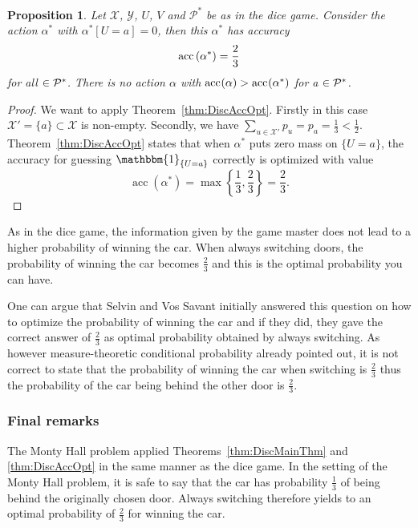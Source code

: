\documentclass[a4paper]{report}
\theoremstyle{plain}
\newtheorem{proposition}[theorem]{Proposition}
\theoremstyle{definition}
\theoremstyle{remark}
\numberwithin{equation}{chapter}
\let\P\relax
\DeclareMathOperator{\P}{\mathbb{P}}
\DeclareMathOperator{\1}{\mathbbm{1}}
\newcommand{\X}{\mathcal{X}}
\newcommand{\Y}{\mathcal{Y}}
\DeclareMathOperator{\acc}{acc}
\newcommand{\Pmod}{\mathcal{P}^*}
\newcommand{\MontyInd}{\1_{\{U=a\}}}
\begin{document}
\begin{proposition}
Let $\X$, $\Y$, $U$, $V$ and $\Pmod$ be as in the dice game. Consider the action $\alpha^*$ with $\alpha^*[U=a]=0$, then this $\alpha^*$ has accuracy
\begin{equation}
\acc^{\P}\left(\alpha^*\right)=\frac{2}{3}
\end{equation}
for all $\P\in\Pmod$. There is no action $\alpha$ with $\acc^{\P}(\alpha)>\acc^{\P}(\alpha^*)$ for a $\P\in\Pmod$.
\end{proposition}
\begin{proof}
We want to apply Theorem~\ref{thm:DiscAccOpt}. Firstly in this case $\X'=\{a\}\subset\X$ is non-empty. Secondly, we have $\sum_{u\in\X'}p_u=p_a=\frac{1}{3}<\frac{1}{2}$. Theorem~\ref{thm:DiscAccOpt} states that when $\alpha^*$ puts zero mass on $\{U=a\}$, the accuracy for guessing $\MontyInd$ correctly is optimized with value
\begin{equation}
\acc\left(\alpha^*\right)=\max\left\{\frac{1}{3},\frac{2}{3}\right\}=\frac{2}{3}.
\end{equation}
\end{proof}

As in the dice game, the information given by the game master does not lead to a higher probability of winning the car. When always switching doors, the probability of winning the car becomes $\frac{2}{3}$ and this is the optimal probability you can have.

One can argue that Selvin and Vos Savant \cite{Selvin75a,Marilyn90a} initially answered this question on how to optimize the probability of winning the car and if they did, they gave the correct answer of $\frac{2}{3}$ as optimal probability obtained by always switching. As however measure-theoretic conditional probability already pointed out, it is not correct to state that the probability of winning the car when switching is $\frac{2}{3}$ thus the probability of the car being behind the other door is $\frac{2}{3}$.

\subsubsection{Final remarks}
The Monty Hall problem applied Theorems~\ref{thm:DiscMainThm} and \ref{thm:DiscAccOpt} in the same manner as the dice game. In the setting of the Monty Hall problem, it is safe to say that the car has probability $\frac{1}{3}$ of being behind the originally chosen door. Always switching therefore yields to an optimal probability of $\frac{2}{3}$ for winning the car.
\end{document}

